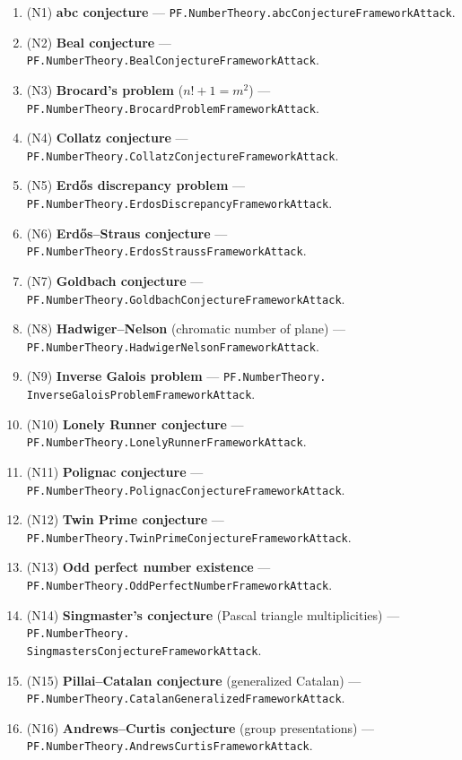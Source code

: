 \documentclass[11pt,a4paper]{article}
\theoremstyle{plain}
\theoremstyle{definition}
\begin{document}
\begin{enumerate}[leftmargin=*,nosep]
\item (N1) \textbf{abc conjecture}
  --- \texttt{PF.NumberTheory.abcConjectureFrameworkAttack}.
\item (N2) \textbf{Beal conjecture}
  --- \texttt{PF.NumberTheory.BealConjectureFrameworkAttack}.
\item (N3) \textbf{Brocard's problem} ($n! + 1 = m^{2}$)
  --- \texttt{PF.NumberTheory.BrocardProblemFrameworkAttack}.
\item (N4) \textbf{Collatz conjecture}
  --- \texttt{PF.NumberTheory.CollatzConjectureFrameworkAttack}.
\item (N5) \textbf{Erd\H{o}s discrepancy problem}
  --- \texttt{PF.NumberTheory.ErdosDiscrepancyFrameworkAttack}.
\item (N6) \textbf{Erd\H{o}s--Straus conjecture}
  --- \texttt{PF.NumberTheory.ErdosStraussFrameworkAttack}.
\item (N7) \textbf{Goldbach conjecture}
  --- \texttt{PF.NumberTheory.GoldbachConjectureFrameworkAttack}.
\item (N8) \textbf{Hadwiger--Nelson} (chromatic number of plane)
  --- \texttt{PF.NumberTheory.HadwigerNelsonFrameworkAttack}.
\item (N9) \textbf{Inverse Galois problem}
  --- \texttt{PF.NumberTheory.\\InverseGaloisProblemFrameworkAttack}.
\item (N10) \textbf{Lonely Runner conjecture}
  --- \texttt{PF.NumberTheory.LonelyRunnerFrameworkAttack}.
\item (N11) \textbf{Polignac conjecture}
  --- \texttt{PF.NumberTheory.PolignacConjectureFrameworkAttack}.
\item (N12) \textbf{Twin Prime conjecture}
  --- \texttt{PF.NumberTheory.TwinPrimeConjectureFrameworkAttack}.
\item (N13) \textbf{Odd perfect number existence}
  --- \texttt{PF.NumberTheory.OddPerfectNumberFrameworkAttack}.
\item (N14) \textbf{Singmaster's conjecture}
  (Pascal triangle multiplicities)
  --- \texttt{PF.NumberTheory.\\SingmastersConjectureFrameworkAttack}.
\item (N15) \textbf{Pillai--Catalan conjecture} (generalized
  Catalan) ---
  \texttt{PF.NumberTheory.CatalanGeneralizedFrameworkAttack}.
\item (N16) \textbf{Andrews--Curtis conjecture}
  (group presentations) ---
  \texttt{PF.NumberTheory.AndrewsCurtisFrameworkAttack}.
\end{enumerate}
\end{document}
